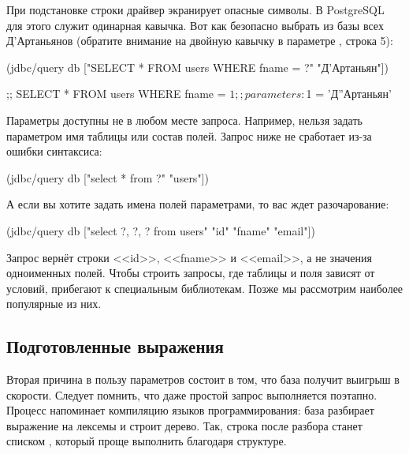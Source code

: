 При подстановке строки драйвер экранирует опасные символы. В PostgreSQL для этого служит одинарная кавычка. Вот как безопасно выбрать из базы всех Д'Артаньянов (обратите внимание на двойную кавычку в параметре , строка 5):

  \begin{clojure/lines}
(jdbc/query db
  ["SELECT * FROM users WHERE fname = ?" "Д'Артаньян"])

;; SELECT * FROM users WHERE fname = $1
;; parameters: $1 = 'Д''Артаньян'
  \end{clojure/lines}

Параметры доступны не в любом месте запроса. Например, нельзя задать параметром имя таблицы или состав полей. Запрос ниже не сработает из-за ошибки синтаксиса:

\begin{english}
  \begin{clojure}
(jdbc/query db ["select * from ?" "users"])
  \end{clojure}
\end{english}

А если вы хотите задать имена полей параметрами, то вас ждет разочарование:

\begin{english}
  \begin{clojure}
(jdbc/query db
  ["select ?, ?, ? from users" "id" "fname" "email"])
  \end{clojure}
\end{english}

Запрос вернёт строки <<id>>, <<fname>> и <<email>>, а не значения одноименных полей. Чтобы строить запросы, где таблицы и поля зависят от условий, прибегают к специальным библиотекам. Позже мы рассмотрим наиболее популярные из них.

\subsection{Подготовленные выражения}


Вторая причина в пользу параметров состоит в том, что база получит выигрыш в скорости. Следует помнить, что даже простой запрос выполняется поэтапно. Процесс напоминает компиляцию языков программирования: база разбирает выражение на лексемы и строит дерево. Так, строка  после разбора станет списком , который проще выполнить благодаря структуре.

